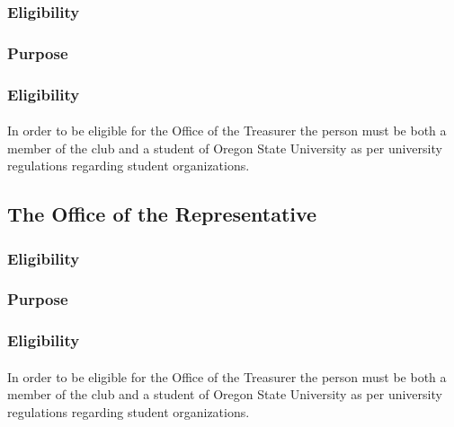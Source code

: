 \documentclass[12pt]{article}
\begin{document}
\subsubsection{Eligibility}
\subsubsection{Purpose}
\subsubsection{Eligibility}
\paragraph{}
In order to be eligible for the Office of the Treasurer the person must be both a member of the club and a student of Oregon State University as per university regulations regarding student organizations.

\subsection{The Office of the Representative}
\subsubsection{Eligibility}
\subsubsection{Purpose}
\subsubsection{Eligibility}
\paragraph{}
In order to be eligible for the Office of the Treasurer the person must be both a member of the club and a student of Oregon State University as per university regulations regarding student organizations.
\end{document}

